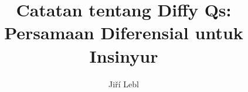 \documentclass[12pt]{book}
\author{Ji\v{r}\'i Lebl}
\title{Catatan tentang Diffy Qs: Persamaan Diferensial untuk Insinyur}
\begin{document}


\newcommand{\theversion}{6.11}
\newcommand{\theedition}{6}
\makediffytitlepage
\end{document}

